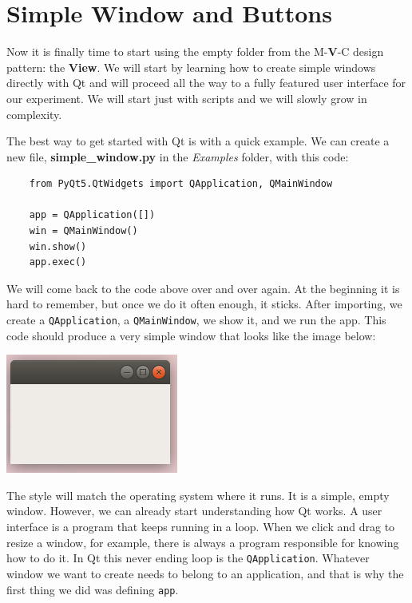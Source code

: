 \section{Simple Window and Buttons}\label{sec:simple-window-andbuttons}
Now it is finally time to start using the empty folder from the M-\textbf{V}-C design pattern: the \textbf{View}. We will start by learning how to create simple windows directly with Qt and will proceed all the way to a fully featured user interface for our experiment. We will start just with scripts and we will slowly grow in complexity.

The best way to get started with Qt is with a quick example. We can create a new file, \textbf{simple\_window.py} in the \emph{Examples} folder, with this code:

\begin{verbatim}
    from PyQt5.QtWidgets import QApplication, QMainWindow

    app = QApplication([])
    win = QMainWindow()
    win.show()
    app.exec()
\end{verbatim}

We will come back to the code above over and over again. At the beginning it is hard to remember, but once we do it often enough, it sticks. After importing, we create a \texttt{QApplication}, a \texttt{QMainWindow}, we show it, and we run the app. This code should produce a very simple window that looks like the image below:

\begin{center}
    \includegraphics[width=.3\textwidth]{images/Chapter_08/01_simple_window.png}
\end{center}

The style will match the operating system where it runs. It is a simple, empty window. However, we can already start understanding how Qt works. A user interface is a program that keeps running in a loop. When we click and drag to resize a window, for example, there is always a program responsible for knowing how to do it. In Qt this never ending loop is the \texttt{QApplication}. Whatever window we want to create needs to belong to an application, and that is why the first thing we did was defining \texttt{app}.

